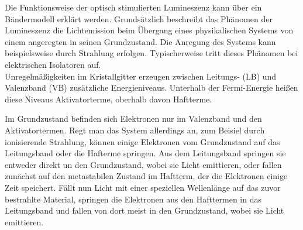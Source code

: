 Die Funktionsweise der optisch stimulierten Lumineszenz kann über ein Bändermodell erklärt werden. Grundsätzlich beschreibt das Phänomen der Lumineszenz die Lichtemission beim Übergang eines physikalischen Systems von einem angeregten in seinen Grundzustand.
Die Anregung des Systems kann beispielsweise durch Strahlung erfolgen. Typischerweise tritt dieses Phänomen bei elektrischen Isolatoren auf.\\
Unregelmäßigkeiten im Kristallgitter erzeugen zwischen Leitungs- (LB) und Valenzband (VB) zusätzliche Energieniveaus. Unterhalb der Fermi-Energie heißen diese Niveaus Aktivatorterme, oberhalb davon Haftterme. 

\begin{center}
    \minipanf    
    \label{fig:band}
    \minipend
\end{center}

Im Grundzustand befinden sich Elektronen nur im Valenzband und den Aktivatortermen.
Regt man das System allerdings an, zum Beisiel durch ionisierende Strahlung, können einige Elektronen vom Grundzustand auf das Leitungsband oder die Hafterme springen. Aus dem Leitungsband springen sie entweder direkt un den Grundzustand, wobei sie Licht emittieren, oder fallen zunächst auf den metastabilen Zustand im Haftterm, der die Elektronen einige Zeit speichert.
Fällt nun Licht mit einer speziellen Wellenlänge auf das zuvor bestrahlte Material, springen die Elektronen aus den Hafttermen in das Leitungsband und fallen von dort meist in den Grundzustand, wobei sie Licht emittieren. \cite{PA_alt}

